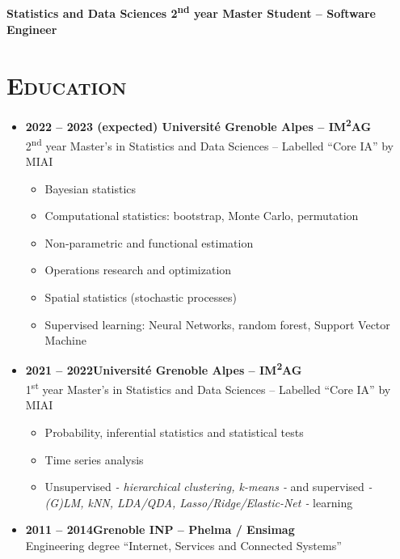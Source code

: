\documentclass{article}
\begin{document}
\begin{minipage}{0.8\textwidth}
\begin{flushleft}
\begin{minipage}{1\textwidth}
\begin{minipage}{.5\textwidth}
\begin{flushright}
\begin{minipage}{.24\textwidth}
\begin{flushright}
            \end{flushright}
            \end{minipage}
        \end{flushright}
        \end{minipage}
    \end{minipage}
    \\[.3 cm]
    \textbf{Statistics and Data Sciences 2\textsuperscript{nd} year Master Student – Software Engineer}
    \\[.5 cm]
    \section*{\textsc{Education}}
    \begin{itemize}
        \item \textbf{2022 – 2023 (expected) \qquad Université Grenoble Alpes – IM\textsuperscript{2}AG} \\
        2\textsuperscript{nd} year Master’s in Statistics and Data Sciences – Labelled “Core IA” by MIAI
        \vspace{-.15cm}
        \begin{itemize}[leftmargin=*]
        \setlength\itemsep{.01cm}
            \item Bayesian statistics
            \item Computational statistics: bootstrap, Monte Carlo, permutation
            \item Non-parametric and functional estimation
            \item Operations research and optimization
            \item Spatial statistics (stochastic processes)
            \item Supervised learning: Neural Networks, random forest, Support Vector Machine
        \end{itemize}
        \item \textbf{2021 – 2022\qquad \qquad \qquad \qquad Université Grenoble Alpes – IM\textsuperscript{2}AG} \\
        1\textsuperscript{st} year Master’s in Statistics and Data Sciences – Labelled “Core IA” by MIAI
        \vspace{-.15cm}
        \begin{itemize}[leftmargin=*]
        \setlength\itemsep{.01cm}
            \item Probability, inferential statistics and statistical tests
            \item Time series analysis
            \item Unsupervised \textit{- hierarchical clustering, k-means -} and supervised \textit{- (G)LM, kNN, LDA/QDA, Lasso/Ridge/Elastic-Net -} learning
        \end{itemize}
        \item \textbf{2011 – 2014\qquad \qquad \qquad \qquad Grenoble INP – Phelma / Ensimag} \\
        Engineering degree “Internet, Services and Connected Systems”
    \end{itemize}

\end{flushleft}
\end{minipage}
\end{document}
